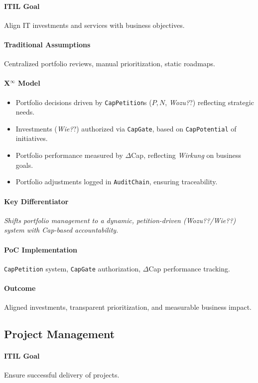\documentclass[12pt, a4paper]{scrartcl}
\newcommand{\Xinf}{X$^\infty$}                        %
\newcommand{\DeltaCap}{$\Delta$Cap}                    %
\newcommand{\CapPotential}{\texttt{CapPotential}}    %
\newcommand{\Wirkung}{\textit{Wirkung}}                 %
\newcommand{\CapGate}{\texttt{CapGate}}
\newcommand{\AuditChain}{\texttt{AuditChain}}
\newcommand{\CapPetition}{\texttt{CapPetition}}        %
\newcommand{\Wozu}{\textit{Wozu?}}                      %
\newcommand{\Wie}{\textit{Wie?}}                        %
\begin{document}
\paragraph{ITIL Goal} Align IT investments and services with business objectives.
\paragraph{Traditional Assumptions} Centralized portfolio reviews, manual prioritization, static roadmaps.
\paragraph*{\Xinf{} Model}
\begin{itemize}
    \item Portfolio decisions driven by \CapPetition{}s ($P, N$, \Wozu?) reflecting strategic needs.
    \item Investments (\Wie?) authorized via \CapGate{}, based on \CapPotential{} of initiatives.
    \item Portfolio performance measured by \DeltaCap{}, reflecting \Wirkung{} on business goals.
    \item Portfolio adjustments logged in \AuditChain{}, ensuring traceability.
\end{itemize}
\paragraph{Key Differentiator} \textit{Shifts portfolio management to a dynamic, petition-driven (\Wozu?/\Wie?) system with Cap-based accountability.}
\paragraph{PoC Implementation} \CapPetition{} system, \CapGate{} authorization, \DeltaCap{} performance tracking.
\paragraph{Outcome} Aligned investments, transparent prioritization, and measurable business impact.

\subsection{Project Management} %
\paragraph{ITIL Goal} Ensure successful delivery of projects.
\end{document}
